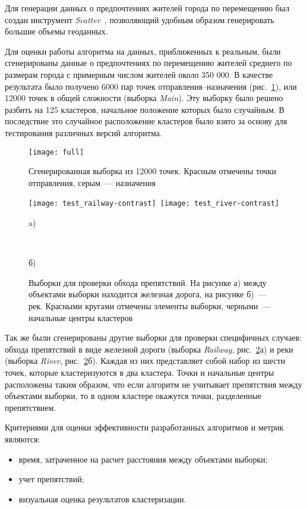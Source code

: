 Для генерации данных о предпочтениях жителей города по перемещению был создан инструмент \emph{Scatter}~\cite{scatter}, позволяющий удобным образом генерировать большие объемы геоданных.

Для оценки работы алгоритма на данных, приближенных к реальным, были сгенерированы данные о предпочтениях по перемещению жителей среднего по размерам города с примерным числом жителей около 350 000. В качестве результата было получено 6000 пар точек отправления--назначения (рис.~\ref{pic:full}), или 12000 точек в общей сложности (выборка \emph{Main}). Эту выборку было решено разбить на 125 кластеров, начальное положение которых было случайным. В последствие это случайное расположение кластеров было взято за основу для тестирования различных версий алгоритма.

\begin{figure}[ht!]
    \centering
    \texttt{[image: full]} \\[1ex]
    \parbox{.9\textwidth}{\caption{Сгенерированная выборка из 12000 точек. Красным отмечены точки отправления, серым~--- назначения} \label{pic:full}}
    \vspace*{-1ex}
\end{figure}

\begin{figure}[b!]
    \centering
    \texttt{[image: test\_railway-contrast]}\
    \texttt{[image: test\_river-contrast]} \\
    \parbox{.47\textwidth}{\small\centering a)}\ \parbox{.47\textwidth}{\small\centering б)}
    \parbox{.9\textwidth}{\caption{Выборки для проверки обхода препятствий. На рисунке а) между объектами выборки находится железная дорога, на рисунке б)~--- рек. Красными кругами отмечены элементы выборки, черными~--- начальные центры кластеров} \label{pic:railway-river}}
    \vspace*{-1ex}
\end{figure}

Так же были сгенерированы другие выборки для проверки специфичных случаев: обхода препятствий в виде железной дороги (выборка \emph{Railway}, рис.~\ref{pic:railway-river}а) и реки (выборка \emph{River}, рис.~\ref{pic:railway-river}б). Каждая из них представляет собой набор из шести точек, которые кластеризуются в два кластера. Точки и начальные центры расположены таким образом, что если алгоритм не учитывает препятствия между объектами выборки, то в одном кластере окажутся точки, разделенные препятствием.

Критериями для оценки эффективности разработанных алгоритмов и метрик являются:
\begin{itemize}
    \item время, затраченное на расчет расстояния между объектами выборки;
    \item учет препятствий;
    \item визуальная оценка результатов кластеризации.
\end{itemize}
